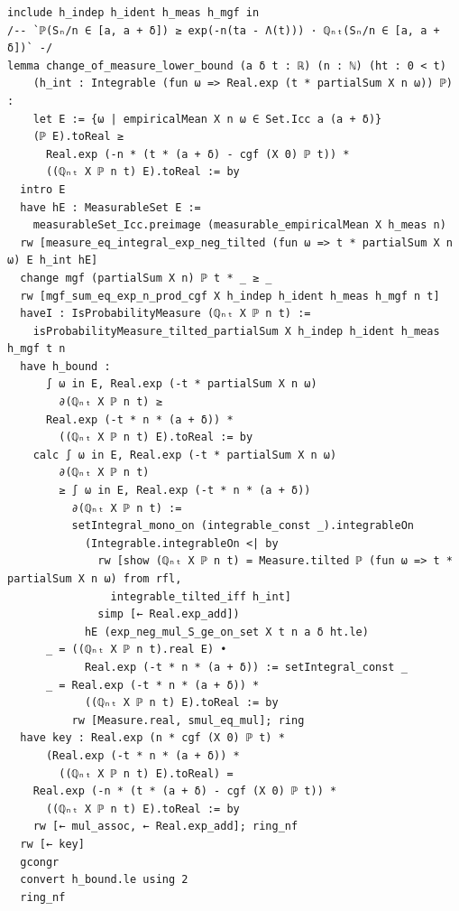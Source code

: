 \begin{lstlisting}
include h_indep h_ident h_meas h_mgf in
/-- `ℙ(Sₙ/n ∈ [a, a + δ]) ≥ exp(-n(ta - Λ(t))) · ℚₙₜ(Sₙ/n ∈ [a, a + δ])` -/
lemma change_of_measure_lower_bound (a δ t : ℝ) (n : ℕ) (ht : 0 < t)
    (h_int : Integrable (fun ω => Real.exp (t * partialSum X n ω)) ℙ) :
    let E := {ω | empiricalMean X n ω ∈ Set.Icc a (a + δ)}
    (ℙ E).toReal ≥
      Real.exp (-n * (t * (a + δ) - cgf (X 0) ℙ t)) *
      ((ℚₙₜ X ℙ n t) E).toReal := by
  intro E
  have hE : MeasurableSet E :=
    measurableSet_Icc.preimage (measurable_empiricalMean X h_meas n)
  rw [measure_eq_integral_exp_neg_tilted (fun ω => t * partialSum X n ω) E h_int hE]
  change mgf (partialSum X n) ℙ t * _ ≥ _
  rw [mgf_sum_eq_exp_n_prod_cgf X h_indep h_ident h_meas h_mgf n t]
  haveI : IsProbabilityMeasure (ℚₙₜ X ℙ n t) :=
    isProbabilityMeasure_tilted_partialSum X h_indep h_ident h_meas h_mgf t n
  have h_bound :
      ∫ ω in E, Real.exp (-t * partialSum X n ω)
        ∂(ℚₙₜ X ℙ n t) ≥
      Real.exp (-t * n * (a + δ)) *
        ((ℚₙₜ X ℙ n t) E).toReal := by
    calc ∫ ω in E, Real.exp (-t * partialSum X n ω)
        ∂(ℚₙₜ X ℙ n t)
        ≥ ∫ ω in E, Real.exp (-t * n * (a + δ))
          ∂(ℚₙₜ X ℙ n t) :=
          setIntegral_mono_on (integrable_const _).integrableOn
            (Integrable.integrableOn <| by
              rw [show (ℚₙₜ X ℙ n t) = Measure.tilted ℙ (fun ω => t * partialSum X n ω) from rfl,
                integrable_tilted_iff h_int]
              simp [← Real.exp_add])
            hE (exp_neg_mul_S_ge_on_set X t n a δ ht.le)
      _ = ((ℚₙₜ X ℙ n t).real E) •
            Real.exp (-t * n * (a + δ)) := setIntegral_const _
      _ = Real.exp (-t * n * (a + δ)) *
            ((ℚₙₜ X ℙ n t) E).toReal := by
          rw [Measure.real, smul_eq_mul]; ring
  have key : Real.exp (n * cgf (X 0) ℙ t) *
      (Real.exp (-t * n * (a + δ)) *
        ((ℚₙₜ X ℙ n t) E).toReal) =
    Real.exp (-n * (t * (a + δ) - cgf (X 0) ℙ t)) *
      ((ℚₙₜ X ℙ n t) E).toReal := by
    rw [← mul_assoc, ← Real.exp_add]; ring_nf
  rw [← key]
  gcongr
  convert h_bound.le using 2
  ring_nf
\end{lstlisting}
\newpage
